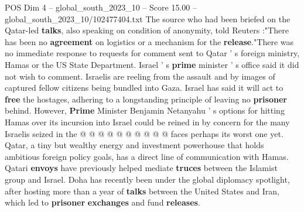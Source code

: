 \begin{textsample}{POS Dim 4 – global\_south\_2023\_10 – Score 15.00 – global\_south\_2023\_10/102477404.txt}
The source who had been briefed on the Qatar-led \textbf{talks}, also speaking on condition of anonymity, told Reuters :"There has been no \textbf{agreement} on logistics or a mechanism for the \textbf{release}."There was no immediate response to requests for comment sent to Qatar ' s foreign ministry, Hamas or the US State Department.
Israel ' s \textbf{prime} minister ' s office said it did not wish to comment.
Israelis are reeling from the assault and by images of captured fellow citizens being bundled into Gaza.
Israel has said it will act to \textbf{free} the hostages, adhering to a longstanding principle of leaving no \textbf{prisoner} behind.
However, \textbf{Prime} Minister Benjamin Netanyahu ' s options for hitting Hamas over its incursion into Israel could be reined in by concern for the many Israelis seized in the @ @ @ @ @ @ @ @ @ @ faces perhaps its worst one yet.
Qatar, a tiny but wealthy energy and investment powerhouse that holds ambitious foreign policy goals, has a direct line of communication with Hamas.
Qatari \textbf{envoys} have previously helped mediate \textbf{truces} between the Islamist group and Israel.
Doha has recently been under the global diplomacy spotlight, after hosting more than a year of \textbf{talks} between the United States and Iran, which led to \textbf{prisoner} \textbf{exchanges} and fund \textbf{releases}.

\end{textsample}
